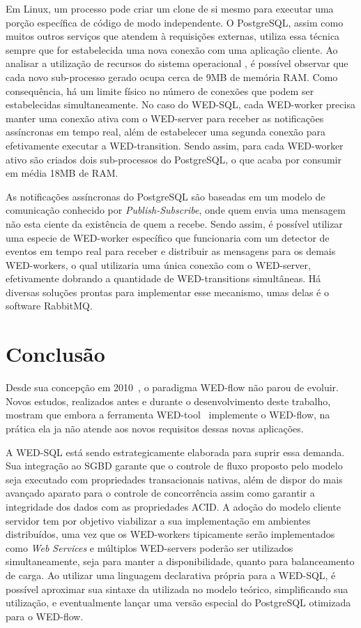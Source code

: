 \documentclass[conference]{IEEEtran}
\begin{document}
\par Em Linux, um processo pode criar um clone de si mesmo para executar uma porção específica de código de modo independente.
O PostgreSQL, assim como muitos outros serviços que atendem à requisições externas, utiliza essa técnica sempre que 
for estabelecida uma nova conexão com uma aplicação cliente. Ao analisar a utilização de recursos do sistema operacional
, é possível observar que cada novo sub-processo gerado ocupa cerca de 9MB de memória RAM. Como consequência, há um limite
físico no número de conexões que podem ser estabelecidas simultaneamente. No caso do WED-SQL, cada WED-worker precisa 
manter uma conexão ativa com o WED-server para receber as notificações
assíncronas em tempo real, além de estabelecer uma segunda conexão para efetivamente executar a WED-transition. Sendo
assim, para cada WED-worker ativo são criados dois sub-processos do PostgreSQL, o que acaba por consumir em média 18MB
de RAM.

\par As notificações assíncronas do PostgreSQL são baseadas em um modelo de comunicação conhecido por \emph{Publish-Subscribe},
onde quem envia uma mensagem não esta ciente da existência de quem a recebe. Sendo assim, é possível utilizar uma especie
de WED-worker específico que funcionaria com um detector de eventos em tempo real para receber e distribuir as mensagens
para os demais WED-workers, o qual utilizaria uma única conexão com o WED-server, efetivamente dobrando a quantidade
de WED-transitions simultâneas. Há diversas soluções prontas para implementar esse mecanismo, umas delas é o software 
RabbitMQ.


\section{Conclusão}

Desde sua concepção em 2010~\cite{FTPM10}, o paradigma WED-flow não parou de evoluir. Novos estudos, realizados antes
e durante o desenvolvimento deste trabalho, mostram que embora a ferramenta WED-tool~\cite{WT} implemente o WED-flow, 
na prática ela ja não atende aos novos requisitos dessas novas aplicações. 

\par A WED-SQL está sendo estrategicamente elaborada para suprir essa demanda. Sua integração ao SGBD garante que o controle
de fluxo proposto pelo modelo seja executado com propriedades transacionais nativas, além de dispor do mais avançado aparato
para o controle de concorrência assim como garantir a integridade dos dados com as propriedades ACID. A adoção do modelo 
cliente servidor tem por objetivo viabilizar a sua implementação em ambientes distribuídos, uma vez que os WED-workers
tipicamente serão implementados como \emph{Web Services} e múltiplos WED-servers poderão ser utilizados simultaneamente,
seja para manter a disponibilidade, quanto para balanceamento de carga. Ao utilizar uma linguagem declarativa própria 
para a WED-SQL, é possível aproximar sua sintaxe da utilizada no modelo teórico, simplificando sua utilização, e eventualmente
lançar uma versão especial do PostgreSQL otimizada para o WED-flow.
\end{document}
